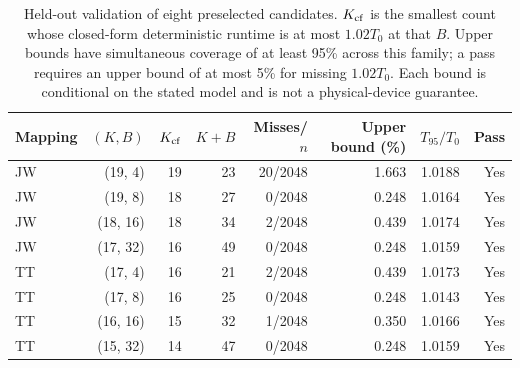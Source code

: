 \begin{table}[htbp]
\centering\small
\begin{tabular}{lrrrrrrr}
\toprule
Mapping & $(K,B)$ & $K_{\rm cf}$ & $K+B$ & Misses/$n$ & Upper bound (\%) & $T_{95}/T_0$ & Pass\\\midrule
JW & (19, 4) & 19 & 23 & 20/2048 & 1.663 & 1.0188 & Yes\\
JW & (19, 8) & 18 & 27 & 0/2048 & 0.248 & 1.0164 & Yes\\
JW & (18, 16) & 18 & 34 & 2/2048 & 0.439 & 1.0174 & Yes\\
JW & (17, 32) & 16 & 49 & 0/2048 & 0.248 & 1.0159 & Yes\\
TT & (17, 4) & 16 & 21 & 2/2048 & 0.439 & 1.0173 & Yes\\
TT & (17, 8) & 16 & 25 & 0/2048 & 0.248 & 1.0143 & Yes\\
TT & (16, 16) & 15 & 32 & 1/2048 & 0.350 & 1.0166 & Yes\\
TT & (15, 32) & 14 & 47 & 0/2048 & 0.248 & 1.0159 & Yes\\
\bottomrule
\end{tabular}
\caption{Held-out validation of eight preselected candidates. $K_{\rm cf}$ is the smallest count whose closed-form deterministic runtime is at most $1.02T_0$ at that $B$. Upper bounds have simultaneous coverage of at least 95\% across this family; a pass requires an upper bound of at most 5\% for missing $1.02T_0$. Each bound is conditional on the stated model and is not a physical-device guarantee.}
\label{tab:validation}
\end{table}
